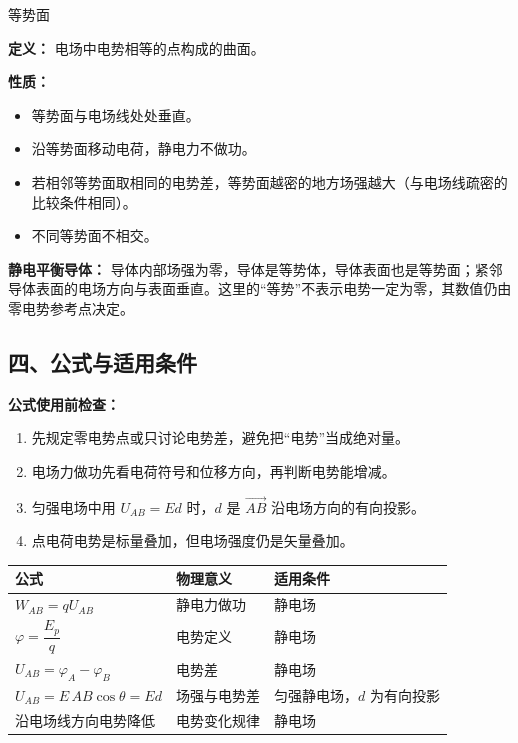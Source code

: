 \begin{conceptbox}{等势面}

\textbf{定义：} 电场中电势相等的点构成的曲面。

\textbf{性质：}
\begin{itemize}
  \item 等势面与电场线处处垂直。
  \item 沿等势面移动电荷，静电力不做功。
  \item 若相邻等势面取相同的电势差，等势面越密的地方场强越大（与电场线疏密的比较条件相同）。
  \item 不同等势面不相交。
\end{itemize}

\textbf{静电平衡导体：} 导体内部场强为零，导体是等势体，导体表面也是等势面；紧邻导体表面的电场方向与表面垂直。这里的“等势”不表示电势一定为零，其数值仍由零电势参考点决定。

\begin{center}


\label{fig:equipotential}
\end{center}

\end{conceptbox}

\begin{samepage}
\section*{四、公式与适用条件}

\textbf{公式使用前检查：}
\nopagebreak[4]
\begin{enumerate}
  \item 先规定零电势点或只讨论电势差，避免把“电势”当成绝对量。
  \item 电场力做功先看电荷符号和位移方向，再判断电势能增减。
  \item 匀强电场中用 $U_{AB}=Ed$ 时，$d$ 是
  $\overrightarrow{AB}$ 沿电场方向的有向投影。
  \item 点电荷电势是标量叠加，但电场强度仍是矢量叠加。
\end{enumerate}
\end{samepage}

\begin{center}
\begin{tabular}{lll}
\toprule
公式 & 物理意义 & 适用条件 \\
\midrule
$W_{AB} = qU_{AB}$ & 静电力做功 & 静电场 \\
$\varphi = \dfrac{E_p}{q}$ & 电势定义 & 静电场 \\
$U_{AB} = \varphi_A - \varphi_B$ & 电势差 & 静电场 \\
$U_{AB}=E\,AB\cos\theta=Ed$ & 场强与电势差 & 匀强静电场，$d$ 为有向投影 \\
沿电场线方向电势降低 & 电势变化规律 & 静电场 \\
\bottomrule
\end{tabular}
\end{center}

